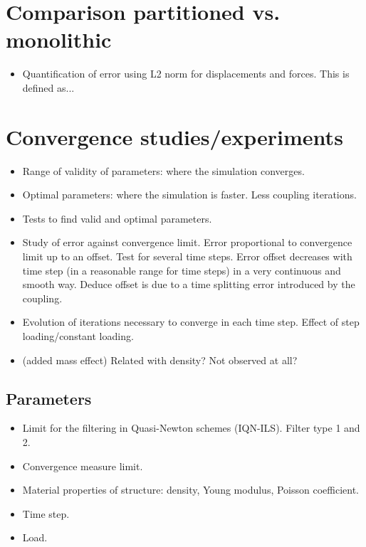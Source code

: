 \documentclass[a4paper, 11pt, oneside]{Thesis}  %
\begin{document}
    \section{Comparison partitioned vs. monolithic}

        \begin{itemize}
            \item Quantification of error using L2 norm for displacements and forces. This is defined as...
        \end{itemize}
            
    \section{Convergence studies/experiments}
    
        \begin{itemize}
            \item Range of validity of parameters: where the simulation converges.
            \item Optimal parameters: where the simulation is faster. Less coupling iterations.
            \item Tests to find valid and optimal parameters.
            \item Study of error against convergence limit. Error proportional to convergence limit up to an offset. Test for several time steps. Error offset decreases with time step (in a reasonable range for time steps) in a very continuous and smooth way. Deduce offset is due to a time splitting error introduced by the coupling.
            \item Evolution of iterations necessary to converge in each time step. Effect of step loading/constant loading.
            \item (added mass effect) Related with density? Not observed at all? 
        \end{itemize}
            
        \subsection{Parameters}
    
            \begin{itemize}
                \item Limit for the filtering in Quasi-Newton schemes (IQN-ILS). Filter type 1 and 2.
                \item Convergence measure limit.
                \item Material properties of structure: density, Young modulus, Poisson coefficient.
                \item Time step.
                \item Load.
            \end{itemize}
            
\end{document}
